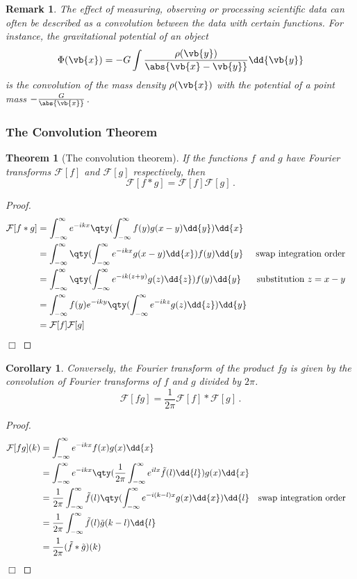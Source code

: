 \documentclass{article}
\theoremstyle{plain}\theoremheaderfont{\normalfont\itshape}\theorembodyfont{\rmfamily}\theoremseparator{.}\newtheorem*{rem}{Remark}\newtheorem*{ex}{Example}\newtheorem*{proof}{Proof}\newtheorem*{altp}{Alternative proof}
\theoremstyle{plain}\theoremheaderfont{\normalfont\bfseries}\theorembodyfont{\rmfamily}\theoremseparator{.}\newtheorem{thm}{Theorem}[section]\newtheorem{lem}[thm]{Lemma}\newtheorem{prop}[thm]{Proposition}\newtheorem*{cor}{Corollary}\newtheorem{defn}[thm]{Definition}\newtheorem{clm}[thm]{Claim}\newtheorem{clminproof}{Claim}
\theoremstyle{break}\theoremheaderfont{\normalfont\itshape}\theorembodyfont{\rmfamily}\theoremseparator{.\medskip}\newtheorem*{proofskip}{Proof}\newtheorem*{exs}{Examples}\newtheorem*{rems}{Remarks}
\theoremstyle{break}\theoremheaderfont{\normalfont\bfseries}\theorembodyfont{\rmfamily}\theoremseparator{.\medskip}\newtheorem{lemskip}[thm]{Lemma}\newtheorem{defnskip}[thm]{Definition}\newtheorem{propskip}[thm]{Proposition}\newtheorem{thmskip}[thm]{Theorem}
\numberwithin{equation}{section}
\newcommand{\qed}{\hfill\ensuremath{\Box}}
\begin{document}
	\begin{rem}
		The effect of measuring, observing or processing scientific data can often be described as a convolution between the data with certain functions. For instance, the gravitational potential of an object
		\[\Phi(\vb{x})=-G\int \frac{\rho(\vb{y})}{\abs{\vb{x}-\vb{y}}}\dd{\vb{y}}\]
		is the convolution of the mass density \(\rho(\vb{x})\) with the potential of a point mass \(-\frac{G}{\abs{\vb{x}}}\).
	\end{rem}
	
	\subsubsection{The Convolution Theorem}
	\begin{thm}[The convolution theorem]\label{conthm}	
		If the functions \(f\) and \(g\) have Fourier transforms \(\mathcal{F}[f]\) and \(\mathcal{F}[g]\) respectively, then
		\[\mathcal{F}[f*g]=\mathcal{F}[f]\mathcal{F}[g]\,.\]
	\end{thm}
	
	\begin{proof}
		\begin{align*}
			\mathcal{F}[f*g]&=\int_{-\infty}^{\infty}e^{-ikx}\qty(\int_{-\infty}^{\infty}f(y)g(x-y)\dd{y})\dd{x}\\
			&=\int_{-\infty}^{\infty}\qty(\int_{-\infty}^{\infty}e^{-ikx}g(x-y)\dd{x}) f(y)\dd{y} & \text{swap integration order}&\\
			&=\int_{-\infty}^{\infty}\qty(\int_{-\infty}^{\infty}e^{-ik(z+y)}g(z)\dd{z}) f(y)\dd{y} & \text{substitution \(z=x-y\)}&\\
			&=\int_{-\infty}^{\infty}f(y)e^{-iky}\qty(\int_{-\infty}^{\infty}e^{-ikz}g(z)\dd{z})\dd{y}\\
			&=\mathcal{F}[f]\mathcal{F}[g]
		\end{align*}\qed
	\end{proof}
	
	\begin{cor}
		Conversely, the Fourier transform of the product \(fg\) is given by the convolution of Fourier transforms of \(f\) and \(g\) divided by \(2\pi\).
		\[\mathcal{F}[fg]=\frac{1}{2\pi}\mathcal{F}[f]*\mathcal{F}[g]\,.\]
	\end{cor}
	
	\begin{proof}
		\begin{align*}
			\mathcal{F}[fg](k)&=\int_{-\infty}^{\infty}e^{-ikx}f(x)g(x)\dd{x}\\
			&=\int_{-\infty}^{\infty}e^{-ikx}\qty(\frac{1}{2\pi}\int_{-\infty}^{\infty}e^{ilx}\tilde{f}(l)\dd{l})g(x)\dd{x}\\
			&=\frac{1}{2\pi}\int_{-\infty}^{\infty}\tilde{f}(l)\qty(\int_{-\infty}^{\infty}e^{-i(k-l)x}g(x)\dd{x})\dd{l} & \text{swap integration order}&\\
			&=\frac{1}{2\pi}\int_{-\infty}^{\infty}\tilde{f}(l)\tilde{g}(k-l)\dd{l}\\
			&=\frac{1}{2\pi}(\tilde{f}*\tilde{g})(k)
		\end{align*}\qed
	\end{proof}
	
\end{document}
